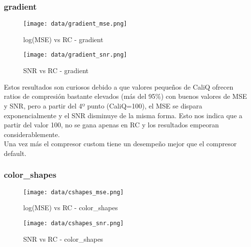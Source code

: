 \documentclass[12pt,a4paper]{article}
\begin{document}
\subsubsection{gradient}
\hspace*{-2.5em}
\begin{minipage}{0.5\textwidth}
        \centering
        \begin{figure}[H]
    \centering
    \texttt{[image: data/gradient\_mse.png]}
    \caption{log(MSE) vs RC - gradient}
    
\end{figure}
\end{minipage}\hfill
    \begin{minipage}{0.5\textwidth}
        \centering
        \begin{figure}[H]
    \centering
    \texttt{[image: data/gradient\_snr.png]}
    \caption{SNR vs RC - gradient}
    
\end{figure}
\end{minipage}
\vspace{2em}

Estos resultados son curiosos debido a que valores pequeños de CaliQ ofrecen ratios de compresión bastante elevados (más del 95\%) con buenos valores de MSE y SNR, pero a partir del 4º punto (CaliQ=100), el MSE se dispara exponencialmente y el SNR disminuye de la misma forma. Esto nos indica que a partir del valor 100, no se gana apenas en RC y los resultados empeoran considerablemente.\\

Una vez más el compresor custom tiene un desempeño mejor que el compresor default.


\subsubsection{color\_shapes}
\hspace*{-2.5em}
\begin{minipage}{0.5\textwidth}
        \centering
        \begin{figure}[H]
    \centering
    \texttt{[image: data/cshapes\_mse.png]}
    \caption{log(MSE) vs RC - color\_shapes}
    
\end{figure}
\end{minipage}\hfill
    \begin{minipage}{0.5\textwidth}
        \centering
        \begin{figure}[H]
    \centering
    \texttt{[image: data/cshapes\_snr.png]}
    \caption{SNR vs RC - color\_shapes}
    
\end{figure}
\end{minipage}
\vspace{2em}
\end{document}
